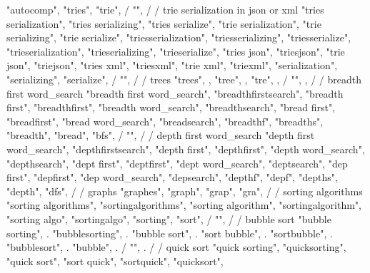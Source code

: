 {{{{{{{        "autocomp",  
        "tries",  
        "trie",  
        / {"", 
        /
        / trie serialization in json or xml 
        "tries serialization",  
        "tries serializing",  
        "tries serialize",  
        "trie serialization",  
        "trie serializing",  
        "trie serialize",  
        "triesserialization",  
        "triesserializing",  
        "triesserialize",  
        "trieserialization",  
        "trieserializing",  
        "trieserialize",  
        "tries json",  
        "triesjson",  
        "trie json",  
        "triejson",  
        "tries xml",  
        "triesxml",  
        "trie xml",  
        "triexml",  
        "serialization",  
        "serializing",  
        "serialize",  
        / {"", 
        /
        / trees 
        "trees", , 
        "tree", , 
        "tre", , 
        / {"", ,
        /
        / breadth first word_search 
        "breadth first word_search",  
        "breadthfirstsearch",  
        "breadth first",  
        "breadthfirst",  
        "breadth word_search",  
        "breadthsearch",  
        "bread first",  
        "breadfirst",  
        "bread word_search",  
        "breadsearch",  
        "breadthf",  
        "breadths",  
        "breadth",  
        "bread",  
        "bfs",  
        / {"", 
        /
        / depth first word_search 
        "depth first word_search",  
        "depthfirstsearch",  
        "depth first",  
        "depthfirst",  
        "depth word_search",  
        "depthsearch",  
        "dept first",  
        "deptfirst",  
        "dept word_search",  
        "deptsearch",  
        "dep first",  
        "depfirst",  
        "dep word_search",  
        "depsearch",  
        "depthf",  
        "depf",  
        "depths",  
        "depth",  
        "dfs",  
        /
        / graphs 
        "graphes", 
        "graph", 
        "grap", 
        "gra", 
        /
        / sorting algorithms 
        "sorting algorithms",  
        "sortingalgorithms",  
        "sorting algorithm",  
        "sortingalgorithm",  
        "sorting algo",  
        "sortingalgo",  
        "sorting",  
        "sort",  
        / {"", 
        /
        / bubble sort 
        "bubble sorting", . 
        "bubblesorting", . 
        "bubble sort", . 
        "sort bubble", . 
        "sortbubble", . 
        "bubblesort", . 
        "bubble", . 
        / {"", .
        /
        / quick sort 
        "quick sorting",  
        "quicksorting",  
        "quick sort",  
        "sort quick",  
        "sortquick",  
        "quicksort",  
}}}}}}}}}}}}}

